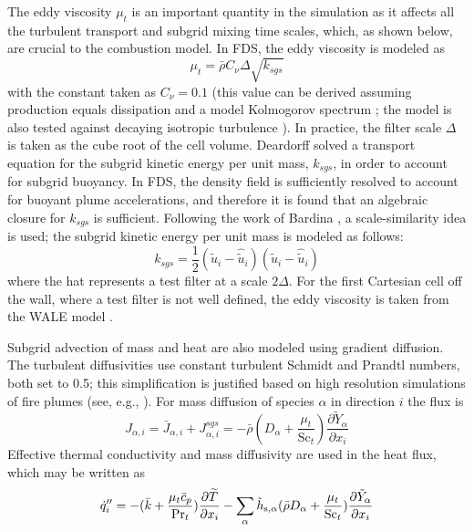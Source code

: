 \documentclass[journal,article,atmosphere,submit,moreauthors,pdftex]{Definitions_Review_Process/mdpi}
\begin{document}
The eddy viscosity $\mu_t$ is an important quantity in the simulation as it affects all the turbulent transport and subgrid mixing time scales, which, as shown below, are crucial to the combustion model.  In FDS, the eddy viscosity is modeled as \cite{Pope:2000,Deardorff:1980}
\begin{equation}
\mu_t = \bar{\rho} C_\nu \Delta \sqrt{k_{sgs}}
\end{equation}
with the constant taken as $C_\nu = 0.1$ (this value can be derived assuming production equals dissipation and a model Kolmogorov spectrum \cite{Pope:2000}; the model is also tested against decaying isotropic turbulence \cite{CBC}).  In practice, the filter scale $\Delta$ is taken as the cube root of the cell volume.  Deardorff \cite{Deardorff:1980} solved a transport equation for the subgrid kinetic energy per unit mass, $k_{sgs}$, in order to account for subgrid buoyancy. In FDS, the density field is sufficiently resolved to account for buoyant plume accelerations, and therefore it is found that an algebraic closure for $k_{sgs}$ is sufficient.  Following the work of Bardina \cite{Bardina:1980}, a scale-similarity idea is used; the subgrid kinetic energy per unit mass is modeled as follows:
\begin{equation}
k_{sgs} = \frac{1}{2}(\tilde{u}_i - \hat{\tilde{u}}_i)(\tilde{u}_i - \hat{\tilde{u}}_i)
\end{equation}
where the hat represents a test filter at a scale $2\Delta$.  For the first Cartesian cell off the wall, where a test filter is not well defined, the eddy viscosity is taken from the WALE model \cite{Nicoud:1999}.

Subgrid advection of mass and heat are also modeled using gradient diffusion.  The turbulent diffusivities use constant turbulent Schmidt and Prandtl numbers, both set to 0.5; this simplification is justified based on high resolution simulations of fire plumes (see, e.g., \cite{Maragkos:2020}). For mass diffusion of species $\alpha$ in direction $i$ the flux is
\begin{equation}
J_{\alpha,i} = \bar{J}_{\alpha,i} + J_{\alpha,i}^{sgs} = -\bar{\rho}(D_\alpha + \frac{\mu_t}{\mathrm{Sc}_t}) \frac{\partial \tilde{Y}_\alpha}{\partial x_i}
\end{equation}
Effective thermal conductivity and mass diffusivity are used in the heat flux, which may be written as
\begin{equation}
{\dot{q}''}_i = -(\bar{k} + \frac{\mu_t \bar{c}_p}{\mathrm{Pr}_t}) \frac{\partial \widetilde{T}}{\partial x_i} - \sum_\alpha \tilde{h}_{{\rm s},\alpha} ( \bar{\rho} D_\alpha + \frac{\mu_t}{\mathrm{Sc}_t} ) \frac{\partial \tilde{Y}_\alpha }{\partial x_i}
\end{equation}
\end{document}
